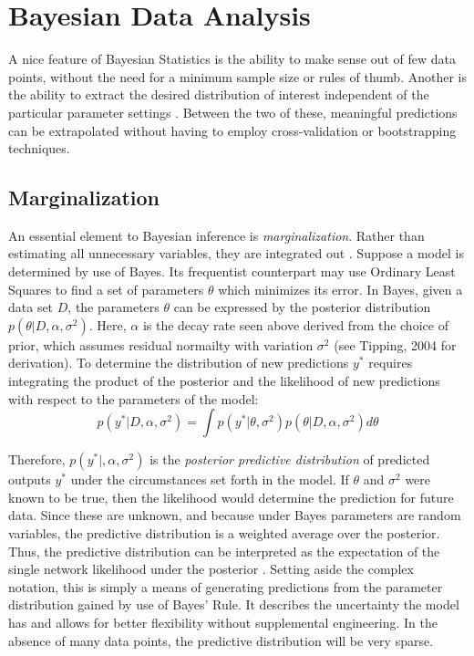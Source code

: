 \section{Bayesian Data Analysis} %


A nice feature of Bayesian Statistics is the ability to make sense out of few data points, without the need for a minimum sample size or rules of thumb.  Another is the ability to extract the desired distribution of interest independent of the particular parameter settings \cite{bishop2006pattern}.  Between the two of these, meaningful predictions can be extrapolated without having to employ cross-validation or bootstrapping techniques.

\subsection{Marginalization}

An essential element to Bayesian inference is \textit{marginalization}.  Rather than estimating all unnecessary variables, they are integrated out
\cite{tipping2004bayesian}.  Suppose a model is determined by use of Bayes.  Its frequentist counterpart may use Ordinary Least Squares to find a set of parameters $\theta$ which minimizes its error. In Bayes, given a data set $D$, the parameters $\theta$ can be expressed by the posterior distribution $p(\theta|D,\alpha,\sigma^2)$.  Here, $\alpha$ is the decay rate seen above derived from the choice of prior, which assumes residual normailty with variation $\sigma^2$ (see Tipping, 2004 \cite{tipping2004bayesian} for derivation).
To determine the distribution of new predictions $y^*$ requires integrating the product of the posterior and the likelihood of new predictions with respect to the parameters of the model:
$$
p(y^*|D,\alpha,\sigma^2) = \int p(y^*|\theta,\sigma^2) p(\theta|D,\alpha,\sigma^2) d\theta
$$

Therefore, $p(y^*|,\alpha,\sigma^2)$ is the \textit{posterior predictive distribution} of predicted outputs $y^*$ under the circumstances set forth in the model.  If $\theta$ and $\sigma^2$ were known to be true, then the likelihood would determine the prediction for future data.  Since these are unknown, and because under Bayes parameters are random variables, the predictive distribution is a weighted average over the posterior.  Thus, the  predictive distribution can be interpreted as the expectation of the single network likelihood under the posterior \cite{salad} \cite{Jospin}.  
Setting aside the complex notation, this is simply a means of generating predictions from the parameter distribution gained by use of Bayes' Rule.  It describes the uncertainty the model has and allows for better flexibility without supplemental engineering.
In the absence of many data points, the predictive distribution will be very sparse. \cite{tipping2004bayesian}

